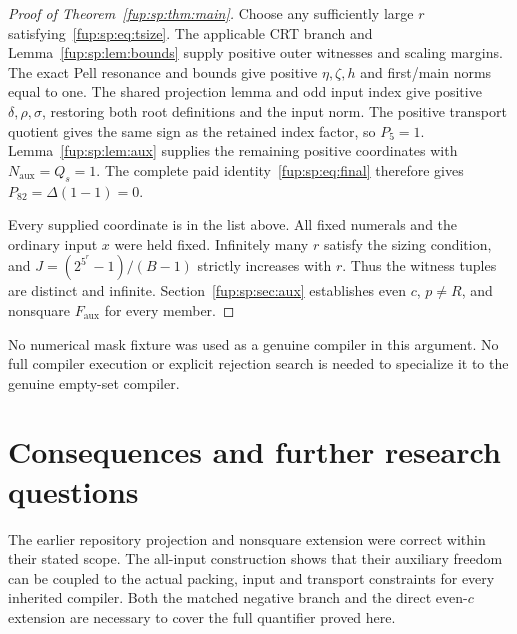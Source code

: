 \documentclass[11pt,letterpaper]{article}
\theoremstyle{definition}\newtheorem{definition}[theorem]{Definition}
\theoremstyle{remark}\newtheorem{remark}[theorem]{Remark}
\newcommand{\D}{\Delta}
\newcommand{\Na}{N_{\mathrm{aux}}}\newcommand{\Nk}{N_{\mathrm{index}}}\newcommand{\Nt}{N_{\mathrm{transport}}}
\newcommand{\Fa}{F_{\mathrm{aux}}}\newcommand{\Ua}{U_{\mathrm{aux}}}\newcommand{\ttt}{t_{\mathrm{tr}}}
\begin{document}
\begin{proof}[Proof of Theorem~\ref{fup:sp:thm:main}]
Choose any sufficiently large $r$ satisfying~\eqref{fup:sp:eq:tsize}.
The applicable CRT branch and Lemma~\ref{fup:sp:lem:bounds} supply positive
outer witnesses and scaling margins. The exact Pell resonance and
bounds give positive $\eta,\zeta,h$ and first/main norms equal to one.
The shared projection lemma and odd input index give positive
$\delta,\rho,\sigma$, restoring both root definitions and the input
norm. The positive transport quotient gives the same sign as the
retained index factor, so $P_5=1$. Lemma~\ref{fup:sp:lem:aux} supplies
the remaining positive coordinates with $\Na=Q_s=1$. The complete
paid identity~\eqref{fup:sp:eq:final} therefore gives $P_{82}=\D(1-1)=0$.

Every supplied coordinate is in the list above. All fixed numerals
and the ordinary input $x$ were held fixed. Infinitely many $r$
satisfy the sizing condition, and
$J=(2^{5^r}-1)/(B-1)$ strictly increases with $r$. Thus the witness
tuples are distinct and infinite. Section~\ref{fup:sp:sec:aux} establishes
even $c$, $p\ne R$, and nonsquare $\Fa$ for every member.
\end{proof}

No numerical mask fixture was used as a genuine compiler in this
argument. No full compiler execution or explicit rejection search
is needed to specialize it to the genuine empty-set compiler.

\section{Consequences and further research questions}
\label{fup:sp:sec:questions}
The earlier repository projection and nonsquare extension were
correct within their stated scope. The all-input construction shows
that their auxiliary freedom can be coupled to the actual packing,
input and transport constraints for every inherited compiler.
Both the matched negative branch and the direct even-$c$ extension
are necessary to cover the full quantifier proved here.
\end{document}
